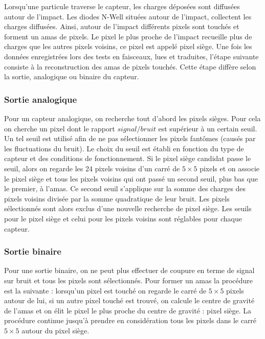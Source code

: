    Lorsqu'une particule traverse le capteur, les charges d\'epos\'ees sont diffus\'ees autour de l'impact. Les diodes N-Well situ\'ees autour de l'impact, collectent les charges diffus\'ees. Ainsi, autour de l'impact différents pixels sont touch\'es et forment un amas de pixels. Le pixel le plus proche de l'impact recueille plus de charges que les autres pixels voisins, ce pixel est appel\'e pixel si\`ege. Une fois les donn\'ees enregistr\'ees lors des tests en faisceaux, lues et traduites, l'\'etape suivante consiste \`a la reconstruction des amas de pixels touch\'es. Cette \'etape diff\`ere selon la sortie, analogique ou binaire du capteur.
   
   \subsubsection{Sortie analogique}
   
   Pour un capteur analogique, on recherche tout d'abord les pixels si\`eges. Pour cela on cherche un pixel dont le rapport $signal/bruit$ est sup\'erieur \`a un certain seuil. Un tel seuil est utilis\'e afin de ne pas sélectionner les pixels fant\^omes (caus\'es par les fluctuations du bruit). Le choix du seuil est \'etabli en fonction du type de capteur et des conditions de fonctionnement. Si le pixel si\`ege candidat passe le seuil, alors on regarde les 24 pixels voisins d'un carr\'e de $5 \times 5$ pixels et on associe le pixel si\`ege et tous les pixels voisins qui ont pass\'e un second seuil, plus bas que le premier, \`a l'amas. Ce second seuil s'applique sur la somme des charges des pixels voisins divis\'ee par la somme quadratique de leur bruit. Les pixels s\'electionn\'es sont alors exclus d'une nouvelle recherche de pixel si\`ege. Les seuils pour le pixel si\`ege et celui pour les pixels voisins sont r\'eglables pour chaque capteur.
   
   \subsubsection{Sortie binaire}
   
   Pour une sortie binaire, on ne peut plus effectuer de coupure en terme de signal sur bruit et tous les pixels sont s\'electionn\'es. Pour former un amas la proc\'edure est la suivante : lorsqu'un pixel est touch\'e on regarde le carr\'e de $5 \times 5$ pixels autour de lui, si un autre pixel touch\'e est trouv\'e, on calcule le centre de gravit\'e de l'amas et on \'elit le pixel le plus proche du centre de gravit\'e : pixel si\`ege. La proc\'edure continue jusqu'\`a prendre en consid\'eration tous les pixels dans le carr\'e $5 \times 5$ autour du pixel si\`ege.
   
